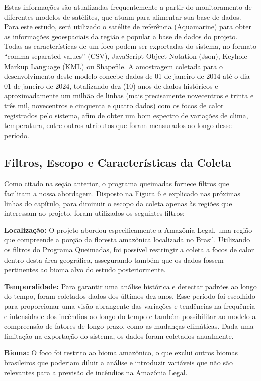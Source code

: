 Estas informações são atualizadas frequentemente a partir do monitoramento de diferentes modelos de satélites, que atuam para alimentar sua base de dados. Para este estudo, será utilizado o satélite de referência (Aquamarine) para obter as informações geoespaciais da região e popular a base de dados do projeto. Todas as características de um foco podem ser exportadas do sistema, no formato “comma-separated-values” (CSV), JavaScript Object Notation (Json), Keyhole Markup Language (KML) ou Shapefile. A amostragem coletada para o desenvolvimento deste modelo concebe dados de 01 de janeiro de 2014 até o dia 01 de janeiro de 2024, totalizando dez (10) anos de dados históricos e aproximadamente um milhão de linhas (mais precisamente novecentros e trinta e três mil, novecentros e cinquenta e quatro dados) com os focos de calor registrados pelo sistema, afim de obter um bom espectro de variações de clima, temperatura, entre outros atributos que foram mensurados ao longo desse período.

\subsection{Filtros, Escopo e Características da Coleta}

Como citado na seção anterior, o programa queimadas fornece filtros que facilitam a nossa abordagem. Disposto na Figura 6 e explicado nas próximas linhas do capítulo, para diminuir o escopo da coleta apenas às regiões que interessam ao projeto, foram utilizados os seguintes filtros:

\textbf{Localização:} O projeto abordou especificamente a Amazônia Legal, uma região que compreende a porção da floresta amazônica localizada no Brasil. Utilizando os filtros do Programa Queimadas, foi possível restringir a coleta a focos de calor dentro desta área geográfica, assegurando também que os dados fossem pertinentes ao bioma alvo do estudo posteriormente.

\textbf{Temporalidade:} Para garantir uma análise histórica e detectar padrões ao longo do tempo, foram coletados dados dos últimos dez anos. Esse período foi escolhido para proporcionar uma visão abrangente das variações e tendências na frequência e intensidade dos incêndios ao longo do tempo e também possibilitar ao modelo a compreensão de fatores de longo prazo, como as mudanças climáticas. Dada uma limitação na exportação do sistema, os dados foram coletados anualmente.

\textbf{Bioma:} O foco foi restrito ao bioma amazônico, o que exclui outros biomas brasileiros que poderiam diluir a análise e introduzir variáveis que não são relevantes para a previsão de incêndios na Amazônia Legal.


